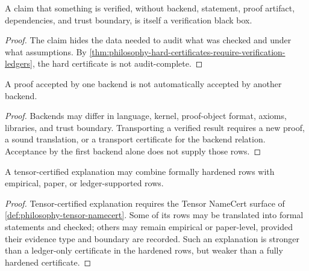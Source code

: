 \begin{corollary}
\label{cor:philosophy-opaque-verification-black-box}
A claim that something is verified, without backend, statement, proof
artifact, dependencies, and trust boundary, is itself a verification
black box.
\end{corollary}
\begin{proof}
The claim hides the data needed to audit what was checked and under what
assumptions. By
\autoref{thm:philosophy-hard-certificates-require-verification-ledgers},
the hard certificate is not audit-complete.
\end{proof}

\begin{theorem}
\label{thm:philosophy-verification-does-not-transfer-across-backends}
A proof accepted by one backend is not automatically accepted by another
backend.
\end{theorem}
\begin{proof}
Backends may differ in language, kernel, proof-object format, axioms,
libraries, and trust boundary. Transporting a verified result requires a
new proof, a sound translation, or a transport certificate for the
backend relation. Acceptance by the first backend alone does not supply
those rows.
\end{proof}

\begin{theorem}
\label{thm:philosophy-machine-learning-explanations-may-be-hybrid}
A tensor-certified explanation may combine formally hardened rows with
empirical, paper, or ledger-supported rows.
\end{theorem}
\begin{proof}
Tensor-certified explanation requires the Tensor NameCert surface of
\autoref{def:philosophy-tensor-namecert}. Some of its rows may be
translated into formal statements and checked; others may remain
empirical or paper-level, provided their evidence type and boundary are
recorded. Such an explanation is stronger than a ledger-only certificate
in the hardened rows, but weaker than a fully hardened certificate.
\end{proof}


